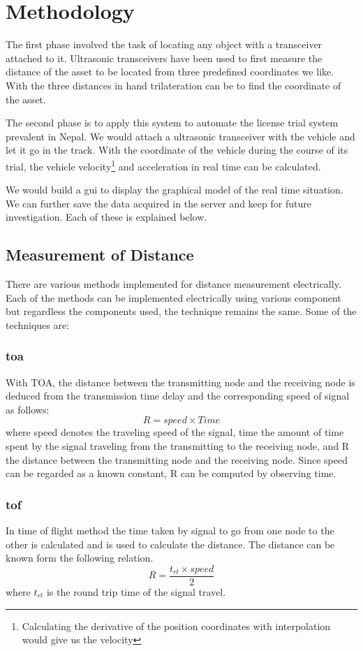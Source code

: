 \section{Methodology}
The first phase involved the task of locating any object with a transceiver attached to it. Ultrasonic transceivers have been used to first measure the distance of the asset to be located from three predefined coordinates we like. With the three distances in hand trilateration can be to find the coordinate of the asset.

The second phase is to apply this system to automate the license trial system prevalent  in Nepal. We would attach a ultrasonic transceiver with the vehicle and let it go in the track. With the coordinate of the vehicle during the course of its trial, the vehicle velocity\footnote{Calculating the derivative of the position coordinates with interpolation would give us the velocity} and acceleration in real time can be calculated. 

We would build a \gls{gui} to display the graphical model of the real time situation. We can further save the data acquired in the server and keep for future investigation. Each of these is explained below.

\subsection{Measurement of Distance}
There are various methods implemented for distance measurement electrically. Each of the methods can be implemented electrically using various component but regardless the components used, the technique remains the same. Some of the techniques are:
\subsubsection{\gls{toa}}
With TOA, the distance between the transmitting node and the receiving node is deduced from the transmission time delay and the corresponding speed of signal as follows:
\begin{equation}
	R = speed \times Time
\end{equation}
where speed denotes the traveling speed of the signal, time the amount of time spent by the signal traveling from the transmitting to the receiving node, and R the distance between the transmitting node and the receiving node. Since speed can be regarded as a known constant, R can be computed by observing time.\cite{1003.1833}

\subsubsection{\gls{tof}}
In time of flight method the time taken by signal to go from one node to the other is calculated and is used to calculate the distance. The distance can be known form the following relation.
\begin{equation}
	R = \frac{t_{rt} \times speed}{2}
\end{equation}
where $t_{rt}$ is the round trip time of the signal travel.

